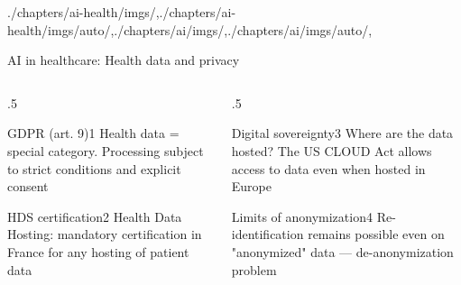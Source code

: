 \begin{graphicspathcontext}{{./chapters/ai-health/imgs/},{./chapters/ai-health/imgs/auto/},{./chapters/ai/imgs/},{./chapters/ai/imgs/auto/},\old}

\begin{frame}[t]{{AI in healthcare:} Health data and privacy}
	\footnotesize
	\begin{columns}
		\begin{column}{.5\linewidth}
			\vspace{.2cm}
			\begin{rightanchorblock}{GDPR (art. 9)}{1}
				Health data = special category. Processing subject to strict conditions and explicit consent
			\end{rightanchorblock}
			\begin{rightanchorblock}{HDS certification}{2}
				Health Data Hosting: mandatory certification in France for any hosting of patient data
			\end{rightanchorblock}
		\end{column}
		\begin{column}{.5\linewidth}
			\begin{rightanchorblock}{Digital sovereignty}{3}
				Where are the data hosted? The US CLOUD Act allows access to data even when hosted in Europe
			\end{rightanchorblock}
			\begin{rightanchorblock}{Limits of anonymization}{4}
				Re-identification remains possible even on "anonymized" data — de-anonymization problem
			\end{rightanchorblock}
		\end{column}
	\end{columns}
	\normalsize
\end{frame}


\end{graphicspathcontext}
